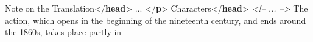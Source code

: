 \begin{shaded}
\mbox{}\newline 
\hspace*{1em}Note on the Translation{</\textbf{head}>}\mbox{}\newline 
\hspace*{1em} ... {</\textbf{p}>}\mbox{}\newline 
{}\mbox{}\newline 
{}\mbox{}\newline 
\hspace*{1em}Characters{</\textbf{head}>}\mbox{}\newline 
\hspace*{1em}\mbox{}\newline 
\hspace*{1em}\hspace*{1em}\mbox{}\newline 
\textit{<!-- ... -->}\mbox{}\newline 
\hspace*{1em}\hspace*{1em}\mbox{}\newline 
\hspace*{1em}\mbox{}\newline 
{}\mbox{}\newline 
{}\mbox{}\newline 
\hspace*{1em}The action, which opens in the beginning of the nineteenth\mbox{}\newline 
\hspace*{1em}\hspace*{1em}\hspace*{1em}\hspace*{1em} century, and ends around the 1860s, takes place partly in\mbox{}\newline 

\end{shaded}
